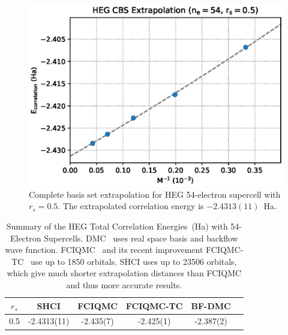 \begin{figure}
  \begin{center}
  \includegraphics[width=\linewidth]{figs/cbs54e_05.eps}
  \end{center}
  \vspace{-0.2cm}
  \caption{Complete basis set extrapolation for HEG 54-electron supercell with $r_s=0.5$.
  The extrapolated correlation energy is $-2.4313(11)$~Ha.
  }
  \label{fig:cbs54e_05}
\end{figure}
\begin{table}
\caption{Summary of the HEG Total Correlation Energies~(Ha) with 54-Electron Supercells.
DMC~\cite{rios2006inhomogeneous} uses real space basis and backflow wave function.
FCIQMC~\cite{shepherd2012full} and its recent improvement FCIQMC-TC~\cite{luo2018combining} use up to 1850 orbitals.
SHCI uses up to 23506 orbitals, which give much shorter extrapolation distances than FCIQMC and thus more accurate results.
}
\label{tab:results54}
\begin{center}
\begin{tabular}{| c || c || c | c | c | c |}
 \hline
 $r_s$ & SHCI & FCIQMC & FCIQMC-TC & BF-DMC \\
 \hline\hline
 0.5 & -2.4313(11) & -2.435(7) & -2.425(1) & -2.387(2) \\
 \hline
 \hline
\end{tabular}
\end{center}
\end{table}

